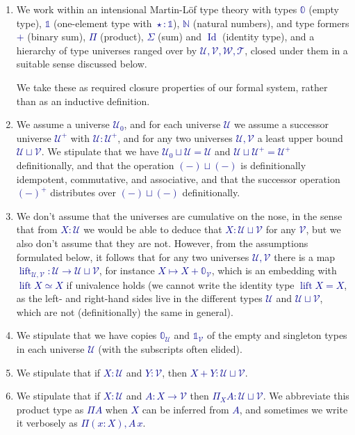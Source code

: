 \documentclass[10pt]{article}
\newcommand{\db}{\textcolor{darkblue}}
\newcommand{\m}[1]{\db{$#1$}}
\newcommand{\lift}{\operatorname{lift}}
\newcommand{\N}{\mathbb{N}}
\newcommand{\U}{\mathcal{U}}
\newcommand{\V}{\mathcal{V}}
\newcommand{\W}{\mathcal{W}}
\newcommand{\T}{\mathcal{T}}
\newcommand{\Zero}{\mathbb{0}}
\newcommand{\One}{\mathbb{1}}
\newcommand{\one}{\operatorname{\star}}
\newcommand{\Id}{\operatorname{Id}}
\theoremstyle{definition}
\begin{document}
\begin{enumerate}
\item We work within an intensional Martin-L\"of type theory with
  types \m{\Zero} (empty type), \m{\One} (one-element type with
  \m{\one:\One}), \m{\N} (natural numbers), and type formers \m{+}
  (binary sum), \m{\Pi} (product), \m{\Sigma} (sum) and \m{\Id}
  (identity type), and a hierarchy of type universes ranged over by
  \m{\U,\V,\W,\T}, closed under them in a suitable sense discussed
  below.

  We take these as required closure properties of our formal system,
  rather than as an inductive definition.

\item We assume a universe \m{\U_0}, and for each universe \m{\U} we
  assume a successor universe \m{\U^+} with \m{\U : \U^+}, and for any
  two universes \m{\U,\V} a least upper bound \m{\U \sqcup \V}. We
  stipulate that we have \m{\U_0 \sqcup \U = \U} and \m{\U \sqcup \U^+
    = \U^+} definitionally, and that the operation \m{(-)\sqcup(-)} is
  definitionally idempotent, commutative, and associative, and that
  the successor operation \m{(-)^+} distributes over \m{(-)\sqcup(-)}
  definitionally.

\item We don't assume that the universes are cumulative on the nose,
  in the sense that from \m{X : \U} we would be able to deduce that
  \m{X : \U \sqcup \V} for any \m{\V}, but we also don't assume that
  they are not. However, from the assumptions formulated below, it
  follows that for any two universes \m{\U,\V} there is a map
  \m{\lift_{\U,\V} : \U \to \U \sqcup \V}, for instance \m{X \mapsto X
    + \Zero_\V}, which is an embedding with \m{\lift X \simeq X} if
  univalence holds (we cannot write the identity type \m{\lift X = X},
  as the left- and right-hand sides live in the different types \m{\U}
  and \m{\U \sqcup \V}, which are not (definitionally) the same in
  general).

\item We stipulate that we have copies \m{\Zero_\U} and \m{\One_\V} of the
  empty and singleton types in each universe \m{\U} (with the subscripts
  often elided).
\item We stipulate that if \m{X : \U} and \m{Y : \V}, then \m{X+Y : \U \sqcup \V}.
\item We stipulate that if \m{X : \U} and \m{A : X \to \V} then
  \m{\Pi_X A : \U \sqcup \V}. We abbreviate this product type as \m{\Pi A}
  when \m{X} can be inferred from \m{A}, and sometimes we write it
  verbosely as \m{\Pi (x:X), A \, x}.


\end{enumerate}
\end{document}
